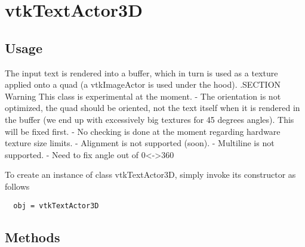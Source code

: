 \section{vtkTextActor3D}

\subsection{Usage}

 The input text is rendered into a buffer, which in turn is used as a
 texture applied onto a quad (a vtkImageActor is used under the hood).
 .SECTION Warning
 This class is experimental at the moment. 
 - The orientation is not optimized, the quad should be oriented, not
   the text itself when it is rendered in the buffer (we end up with
   excessively big textures for 45 degrees angles).
   This will be fixed first.
 - No checking is done at the moment regarding hardware texture size limits.
 - Alignment is not supported (soon).
 - Multiline is not supported.
 - Need to fix angle out of 0<->360


To create an instance of class vtkTextActor3D, simply
invoke its constructor as follows
\begin{verbatim}
  obj = vtkTextActor3D
\end{verbatim}
\subsection{Methods}

